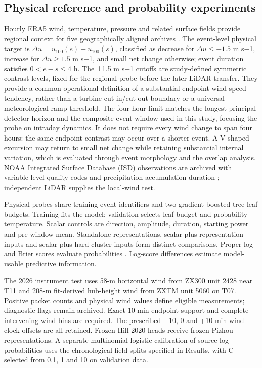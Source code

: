 \documentclass[preprint,12pt]{elsarticle}
\begin{document}
\subsection{Physical reference and probability experiments}\label{physical-reference-and-probability-experiments}

Hourly ERA5 wind, temperature, pressure and related surface fields provide regional context for five geographically aligned archives \citep{hersbach2020, era5docs}. The event-level physical target is \(\Delta u=u_{100}(e)-u_{100}(s)\), classified as decrease for \(\Delta u\le-1.5\) m s−1, increase for \(\Delta u\ge1.5\) m s−1, and small net change otherwise; event duration satisfies \(0<e-s\le4\) h. The ±1.5 m s−1 cutoffs are study-defined symmetric contrast levels, fixed for the regional probe before the later LiDAR transfer. They provide a common operational definition of a substantial endpoint wind-speed tendency, rather than a turbine cut-in/cut-out boundary or a universal meteorological ramp threshold. The four-hour limit matches the longest principal detector horizon and the composite-event window used in this study, focusing the probe on intraday dynamics. It does not require every wind change to span four hours: the same endpoint contrast may occur over a shorter event. A V-shaped excursion may return to small net change while retaining substantial internal variation, which is evaluated through event morphology and the overlap analysis. NOAA Integrated Surface Database (ISD) observations are archived with variable-level quality codes and precipitation accumulation duration \citep{noaaisd}; independent LiDAR supplies the local-wind test.

Physical probes share training-event identifiers and two gradient-boosted-tree leaf budgets. Training fits the model; validation selects leaf budget and probability temperature. Scalar controls are direction, amplitude, duration, starting power and pre-window mean. Standalone representations, scalar-plus-representation inputs and scalar-plus-hard-cluster inputs form distinct comparisons. Proper log and Brier scores evaluate probabilities \citep{gneiting2007}. Log-score differences estimate model-usable predictive information.

The 2026 instrument test uses 58-m horizontal wind from ZX300 unit 2428 near T11 and 208-m fit-derived hub-height wind from ZXTM unit 5060 on T07. Positive packet counts and physical wind values define eligible measurements; diagnostic flags remain archived. Exact 10-min endpoint support and complete intervening wind bins are required. The prescribed −10, 0 and +10-min wind-clock offsets are all retained. Frozen Hill-2020 heads receive frozen Pizhou representations. A separate multinomial-logistic calibration of source log probabilities uses the chronological field splits specified in Results, with C selected from 0.1, 1 and 10 on validation data.
\end{document}
